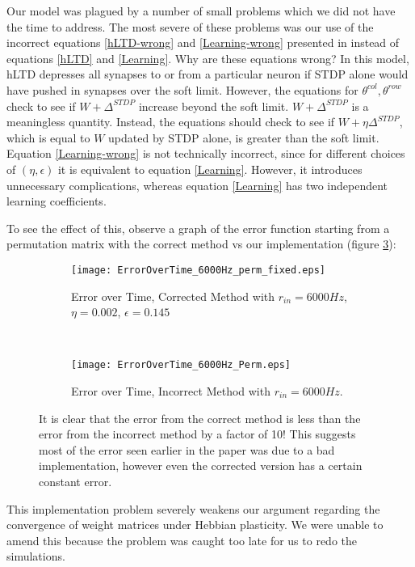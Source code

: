 Our model was plagued by a number of small problems which we did not have the time to address. The most severe of these problems was our use of the incorrect equations \eqref{hLTD-wrong} and \eqref{Learning-wrong} presented in \cite{Fiete} instead of equations \eqref{hLTD} and \eqref{Learning}. Why are these equations wrong? In this model, hLTD depresses all synapses to or from a particular neuron if STDP alone would have pushed in synapses over the soft limit. However, the equations for \(\theta^{col},\theta^{row}\) check to see if \(W + \Delta^{STDP}\) increase beyond the soft limit. \(W + \Delta^{STDP}\) is a meaningless quantity. Instead, the equations should check to see if \(W + \eta\Delta^{STDP}\), which is equal to \(W\) updated by STDP alone, is greater than the soft limit. Equation \eqref{Learning-wrong} is not technically incorrect, since for different choices of \((\eta,\epsilon)\) it is equivalent to equation \eqref{Learning}. However, it introduces unnecessary complications, whereas equation \eqref{Learning} has two independent learning coefficients.

To see the effect of this, observe a graph of the error function starting from a permutation matrix with the correct method vs our implementation (figure \ref{EoT}):

\begin{figure}[H]
\centering
\begin{subfigure}[b]{0.49\textwidth}
\texttt{[image: ErrorOverTime\_6000Hz\_perm\_fixed.eps]}
\caption{Error over Time, Corrected Method with \(r_{in} = 6000Hz\), \(\eta = 0.002\), \(\epsilon = 0.145\)}
\label{EoT: fixed}
\end{subfigure}
\,
\begin{subfigure}[b]{0.49\textwidth}
\texttt{[image: ErrorOverTime\_6000Hz\_Perm.eps]}
\caption{Error over Time, Incorrect Method with \(r_{in} = 6000Hz\).}
\label{EoT: broken}
\end{subfigure}
\caption{It is clear that the error from the correct method is less than the error from the incorrect method by a factor of 10! This suggests most of the error seen earlier in the paper was due to a bad implementation, however even the corrected version has a certain constant error.}
\label{EoT}
\end{figure}

This implementation problem severely weakens our argument regarding the convergence of weight matrices under Hebbian plasticity. We were unable to amend this because the problem was caught too late for us to redo the simulations. 

